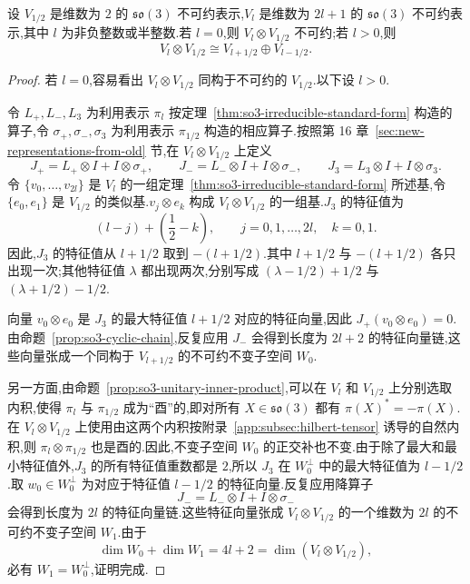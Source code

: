 \begin{proposition}\label{prop:so3-tensor-half}
设 $V_{1/2}$ 是维数为 $2$ 的 $\mathfrak{so}(3)$ 不可约表示,$V_l$ 是维数为 $2l+1$ 的 $\mathfrak{so}(3)$ 不可约表示,其中 $l$ 为非负整数或半整数.若 $l=0$,则 $V_l\otimes V_{1/2}$ 不可约;若 $l>0$,则
\[
 V_l\otimes V_{1/2}\cong V_{l+1/2}\oplus V_{l-1/2}.
\]
\end{proposition}

\begin{proof}
若 $l=0$,容易看出 $V_l\otimes V_{1/2}$ 同构于不可约的 $V_{1/2}$.以下设 $l>0$.

令 $L_+,L_-,L_3$ 为利用表示 $\pi_l$ 按定理~\ref{thm:so3-irreducible-standard-form} 构造的算子,令 $\sigma_+,\sigma_-,\sigma_3$ 为利用表示 $\pi_{1/2}$ 构造的相应算子.按照第 16 章~\ref{sec:new-representations-from-old} 节,在 $V_l\otimes V_{1/2}$ 上定义
\[
 J_+=L_+\otimes I+I\otimes\sigma_+,\qquad
 J_-=L_-\otimes I+I\otimes\sigma_-,\qquad
 J_3=L_3\otimes I+I\otimes\sigma_3.
\label{eq:angular-momentum-tensor-product-operators}
\]
令 $\{v_0,\ldots,v_{2l}\}$ 是 $V_l$ 的一组定理~\ref{thm:so3-irreducible-standard-form} 所述基,令 $\{e_0,e_1\}$ 是 $V_{1/2}$ 的类似基.$v_j\otimes e_k$ 构成 $V_l\otimes V_{1/2}$ 的一组基.$J_3$ 的特征值为
\[
 (l-j)+\left(\frac12-k\right),
\qquad j=0,1,\ldots,2l,\quad k=0,1.
\]
因此,$J_3$ 的特征值从 $l+1/2$ 取到 $-(l+1/2)$.其中 $l+1/2$ 与 $-(l+1/2)$ 各只出现一次;其他特征值 $\lambda$ 都出现两次,分别写成 $(\lambda-1/2)+1/2$ 与 $(\lambda+1/2)-1/2$.

向量 $v_0\otimes e_0$ 是 $J_3$ 的最大特征值 $l+1/2$ 对应的特征向量,因此 $J_+(v_0\otimes e_0)=0$.由命题~\ref{prop:so3-cyclic-chain},反复应用 $J_-$ 会得到长度为 $2l+2$ 的特征向量链,这些向量张成一个同构于 $V_{l+1/2}$ 的不可约不变子空间 $W_0$.

另一方面,由命题~\ref{prop:so3-unitary-inner-product},可以在 $V_l$ 和 $V_{1/2}$ 上分别选取内积,使得 $\pi_l$ 与 $\pi_{1/2}$ 成为“酉”的,即对所有 $X\in\mathfrak{so}(3)$ 都有 $\pi(X)^*=-\pi(X)$.在 $V_l\otimes V_{1/2}$ 上使用由这两个内积按附录~\ref{app:subsec:hilbert-tensor} 诱导的自然内积,则 $\pi_l\otimes\pi_{1/2}$ 也是酉的.因此,不变子空间 $W_0$ 的正交补也不变.由于除了最大和最小特征值外,$J_3$ 的所有特征值重数都是 $2$,所以 $J_3$ 在 $W_0^\perp$ 中的最大特征值为 $l-1/2$.取 $w_0\in W_0^\perp$ 为对应于特征值 $l-1/2$ 的特征向量.反复应用降算子
\[
 J_-=L_-\otimes I+I\otimes\sigma_-
\]
会得到长度为 $2l$ 的特征向量链.这些特征向量张成 $V_l\otimes V_{1/2}$ 的一个维数为 $2l$ 的不可约不变子空间 $W_1$.由于
\[
 \dim W_0+\dim W_1=4l+2=\dim(V_l\otimes V_{1/2}),
\]
必有 $W_1=W_0^\perp$,证明完成.
\end{proof}


